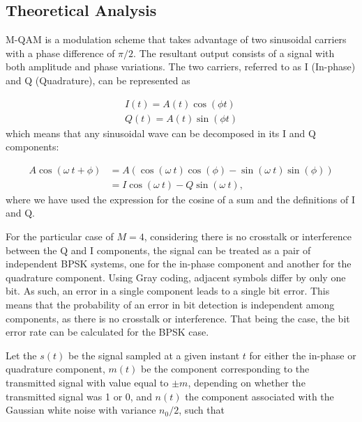 
\subsection{Theoretical Analysis}

M-QAM is a modulation scheme that takes advantage of two sinusoidal carriers with a phase difference of $\pi/2$. The resultant output consists of a signal with both amplitude and phase variations. The two carriers, referred to as I (In-phase) and Q (Quadrature), can be represented as

\begin{align}
	I(t)=A(t)\cos(\phi t) \\
	Q(t)=A(t)\sin(\phi t)
\end{align}
which means that any sinusoidal wave can be decomposed in its I and Q components:

\begin{align}
	A\cos(\omega~t+\phi)&=A\left(\cos(\omega~t)\cos(\phi)-\sin(\omega~t)\sin(\phi)\right) \\
	&=I\cos(\omega~t)-Q\sin(\omega~t),
\end{align}
where we have used the expression for the cosine of a sum and the definitions of I and Q.



For the particular case of $M=4$, considering there is no crosstalk or interference between the Q and I components, the signal can be treated as a pair of independent BPSK systems, one for the in-phase component and another for the quadrature component.
Using Gray coding, adjacent symbols differ by only one bit. As such, an error in a single component leads to a single bit error.
This means that the probability of an error in bit detection is independent among components, as there is no crosstalk or interference. That being the case, the bit error rate can be calculated for the BPSK case.


Let the $s(t)$ be the signal sampled at a given instant $t$ for either the in-phase or quadrature component, $m(t)$ be the component corresponding to the transmitted signal with value equal to $\pm m$, depending on whether the transmitted signal was 1 or 0, and $n(t)$ the component associated with the Gaussian white noise with variance $n_0/2$, such that

